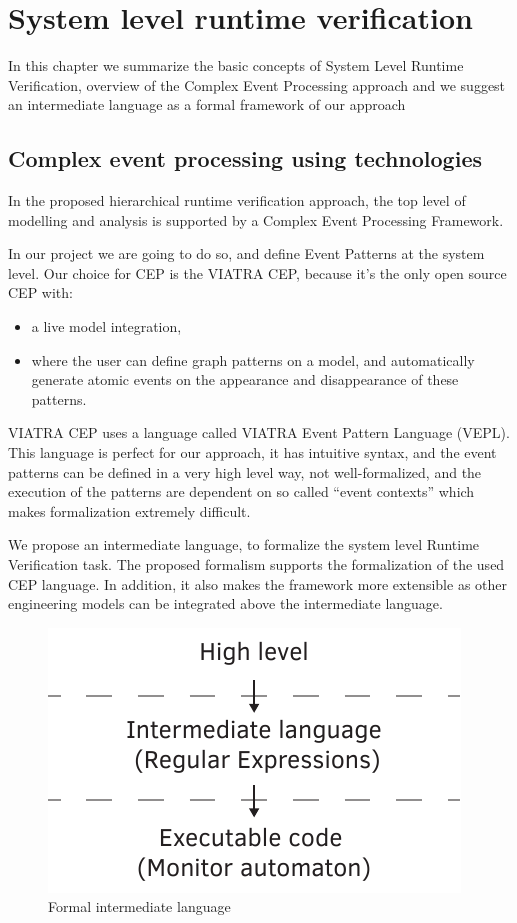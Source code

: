 \chapter{System level runtime verification}
	\label{chap:cep}
		In this chapter we summarize the basic concepts of System Level Runtime Verification,
		overview of the Complex Event Processing approach and we suggest an intermediate language as a formal framework of our approach
	
	\section{Complex event processing using technologies}
	
	
	
		In the proposed hierarchical runtime verification approach, the top level of modelling and analysis is supported by a Complex Event Processing Framework.
		
		In our project we are going to do so, and define Event Patterns at the system level.
		Our choice for CEP is the VIATRA CEP, because it's the only open source CEP with:
		\begin{itemize}
			\item a live model integration, 
			\item where the user can define graph patterns on a model, and automatically generate atomic events on the appearance and disappearance of these patterns.
		\end{itemize}
		
		
		VIATRA CEP uses a language called VIATRA Event Pattern Language (VEPL).
		This language is perfect for our approach, it has intuitive syntax, and the event patterns can be defined in
		a very high level way, not well-formalized, and the
		execution of the patterns are dependent on so called ``event contexts'' which makes formalization extremely difficult.
		
		We propose an intermediate language, to formalize the system level Runtime Verification task.
		The proposed formalism supports the formalization of the used CEP language.
		In addition, it also makes the framework more extensible as other engineering models can be integrated above the intermediate language.
		
		\begin{figure}[h]
		\centering
		\includegraphics[width=0.7\linewidth]{include/figures/chapter_5/sandwich}
		\caption{Formal intermediate language}
		\label{fig:cep:sandwich}
		\end{figure}

